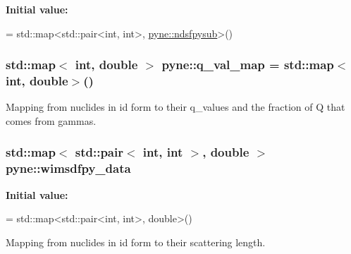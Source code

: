 {\bfseries Initial value\-:}
\begin{DoxyCode}
= 
  std::map<std::pair<int, int>, \hyperlink{structpyne_1_1ndsfpysub}{pyne::ndsfpysub}>()
\end{DoxyCode}
\hypertarget{namespacepyne_af7b850fa105454bc35f4167d41071239}{
\subsubsection[{q\-\_\-val\-\_\-map}]{\setlength{\rightskip}{0pt plus 5cm}std\-::map$<$ int, double $>$ pyne\-::q\-\_\-val\-\_\-map = std\-::map$<$int, double$>$()}}\label{namespacepyne_af7b850fa105454bc35f4167d41071239}
Mapping from nuclides in id form to their q\-\_\-values and the fraction of Q that comes from gammas. \hypertarget{namespacepyne_a2512ebcde5e39e49cd6ed25bb09ff374}{
\subsubsection[{wimsdfpy\-\_\-data}]{\setlength{\rightskip}{0pt plus 5cm}std\-::map$<$ std\-::pair$<$ int, int $>$, double $>$ pyne\-::wimsdfpy\-\_\-data}}\label{namespacepyne_a2512ebcde5e39e49cd6ed25bb09ff374}
{\bfseries Initial value\-:}
\begin{DoxyCode}
= 
  std::map<std::pair<int, int>, \textcolor{keywordtype}{double}>()
\end{DoxyCode}


Mapping from nuclides in id form to their scattering length. 

